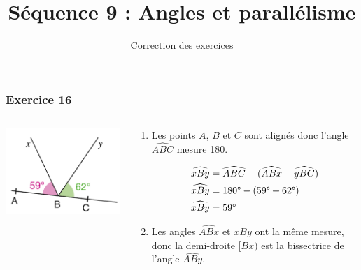 \documentclass[xcolor={dvipsnames}]{beamer}
\title{Séquence 9 : Angles et parallélisme}
\subtitle{Correction des exercices}
\begin{document}


	

\begin{frame}
	\frametitle{Exercice 16}
	\begin{columns}
		\begin{column}{0.4\textwidth}
			\begin{center}
				\includegraphics[scale=0.5]{16}\pause
			\end{center}
		\end{column}
		\begin{column}{0.6\textwidth}
			\begin{enumerate}
				\item Les points $A$, $B$ et $C$ sont alignés donc l'angle $\widehat{ABC}$ mesure 180\degree . 
				
				\begin{align*}
				\widehat{xBy} &= \widehat{ABC} - (\widehat{ABx}+ \widehat{yBC}) \\
				\widehat{xBy} &= 180 \degree - (59 \degree + 62 \degree) \\
				\widehat{xBy} &= 59\degree 
				\end{align*}\pause
				\item Les angles $\widehat{ABx}$ et $\widehat{xBy}$ ont la même mesure, donc la demi-droite $[Bx)$ est la bissectrice de l'angle $\widehat{ABy} $.
			\end{enumerate}
		\end{column}
	\end{columns}
	
	
	
	
	
\end{frame}
\end{document}
